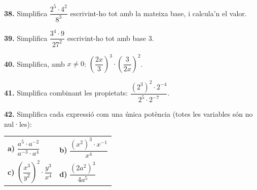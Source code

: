 \documentclass[13pt,a4paper]{extarticle}
\begin{document}
\par\noindent\begin{minipage}{\linewidth}
\textbf{38.} Simplifica $\dfrac{2^5\cdot 4^2}{8^3}$ escrivint-ho tot amb la mateixa base, i calcula'n el valor.\par
\end{minipage}\par\vspace{1.6mm}
\par\noindent\begin{minipage}{\linewidth}
\textbf{39.} Simplifica $\dfrac{3^4\cdot 9}{27^2}$ escrivint-ho tot amb base $3$.\par
\end{minipage}\par\vspace{1.6mm}
\par\noindent\begin{minipage}{\linewidth}
\textbf{40.} Simplifica, amb $x\neq 0$: $\left(\dfrac{2x}{3}\right)^3 \cdot \left(\dfrac{3}{2x}\right)^2$.\par
\end{minipage}\par\vspace{1.6mm}
\par\noindent\begin{minipage}{\linewidth}
\textbf{41.} Simplifica combinant les propietats: $\dfrac{\left(2^3\right)^2\cdot 2^{-4}}{2^5\cdot 2^{-7}}$.\par
\end{minipage}\par\vspace{1.6mm}
\par\noindent\begin{minipage}{\linewidth}
\textbf{42.} Simplifica cada expressió com una única potència (totes les variables són no nul·les):\par

\begin{tabular}{@{}p{.46\linewidth}p{.46\linewidth}@{}}
\textbf{a)} $\dfrac{a^5\cdot a^{-2}}{a^{-3}\cdot a^4}$ & \textbf{b)} $\dfrac{\left(x^2\right)^3\cdot x^{-1}}{x^4}$ \\[2pt]
\textbf{c)} $\left(\dfrac{x^3}{y^2}\right)^2\cdot\dfrac{y^3}{x^4}$ & \textbf{d)} $\dfrac{\left(2a^2\right)^3}{4a^5}$ \\[2pt]
\end{tabular}\par
\end{minipage}\par\vspace{1.6mm}
\end{document}
